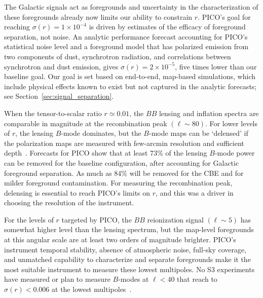 \documentclass[PICOReport.tex]{subfiles}
\begin{document}
The Galactic signals act as foregrounds and uncertainty in the characterization of these foregrounds already now limits our ability to constrain $r$. PICO's goal for reaching $\sigma(r) = 1\times10^{-4}$ is driven by estimates of the efficacy of foreground separation, not noise.  An analytic performance forecast accounting for PICO's statistical noise level and a foreground model that has polarized emission from two components of dust, synchrotron radiation, and correlations between synchrotron and dust emission, gives $\sigma(r) = 2\times10^{-5}$, five times lower than our baseline goal. Our goal is set based on end-to-end, map-based simulations, which include physical effects known to exist but not captured in the analytic forecasts; see Section~\ref{sec:signal_separation}.   

When the tensor-to-scalar ratio $r \simeq 0.01$, the $BB$ lensing and inflation spectra are comparable in magnitude at the recombination peak $(\ell \sim 80)$. For lower levels of $r$, the lensing $B$-mode dominates, but the $B$-mode maps can be `delensed' if the polarization maps are measured with few-arcmin resolution and sufficient depth~\citep{2004PhRvD..69d3005S,2012JCAP...06..014S}. Forecasts for PICO show that at least 73\% of the lensing $B$-mode power can be removed for the baseline configuration, after accounting for Galactic foreground separation. As much as 84\% will be removed for the CBE and for milder foreground contamination. For measuring the recombination peak, delensing is essential to reach PICO's limits on $r$, and this was a driver in choosing the resolution of the instrument. 

For the levels of $r$ targeted by PICO, the $BB$ reionization signal $(\ell \sim 5)$ has somewhat higher level than the lensing spectrum, but the map-level foregrounds at this angular scale are at least two orders of magnitude brighter.  PICO's instrument temporal stability, absence of atmospheric noise, full-sky coverage, and unmatched capability to characterize and separate foregrounds make it the most suitable instrument to measure these lowest multipoles. No S3 experiments have measured or plan to measure $B$-modes at $\ell<40$ that reach to $\sigma(r) < 0.006$ at the lowest multipoles~\citep{class,piper}. 
\end{document}
